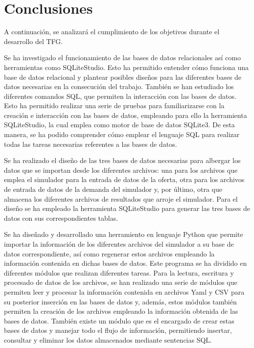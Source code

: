\chapter{Conclusiones}
\label{ch:conclusiones}

A continuación, se analizará el cumplimiento de los objetivos durante el desarrollo del \acrshort{TFG}.

Se ha investigado el funcionamiento de las bases de datos relacionales así como herramientas como SQLiteStudio. Esto ha permitido entender cómo funciona una base de datos relacional y plantear posibles diseños para las diferentes bases de datos necesarias en la consecución del trabajo. También se han estudiado los diferentes comandos \acrshort{SQL}, que permiten la interacción con las bases de datos. Esto ha permitido realizar una serie de pruebas para familiarizarse con la creación e interacción con las bases de datos, empleando para ello la herramienta SQLiteStudio, la cual emplea como motor de base de datos SQLite3. De esta manera, se ha podido comprender cómo emplear el lenguaje \acrshort{SQL} para realizar todas las tareas necesarias referentes a las bases de datos.

Se ha realizado el diseño de las tres bases de datos necesarias para albergar los datos que se importan desde los diferentes archivos: una para los archivos que emplea el simulador para la entrada de datos de la oferta, otra para los archivos de entrada de datos de la demanda del simulador y, por último, otra que almacena los diferentes archivos de resultados que arroje el simulador. Para el diseño se ha empleado la herramienta SQLiteStudio para generar las tres bases de datos con sus correspondientes tablas.

Se ha diseñado y desarrollado una herramiento en lenguaje Python que permite importar la información de los diferentes archivos del simulador a su base de datos correspondiente, así como regenerar estos archivos empleando la información contenida en dichas bases de datos. Este programa se ha dividido en diferentes módulos que realizan diferentes tareas. Para la lectura, escritura y procesado de datos de los archivos, se han realizado una serie de módulos que permiten leer y procesar la información contenida en archivos \acrshort{Yaml} y \acrshort{CSV} para su posterior inserción en las bases de datos y, además, estos módulos también permiten la creación de los archivos empleando la información obtenida de las bases de datos. También existe un módulo que es el encargado de crear estas bases de datos y manejar todo el flujo de información, permitiendo insertar, consultar y eliminar los datos almacenados mediante sentencias \acrshort{SQL}.

